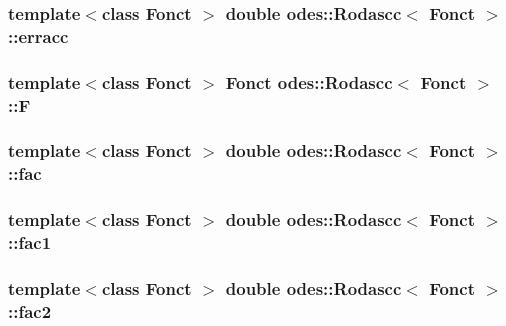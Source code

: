 \hypertarget{classodes_1_1Rodascc_a86ce68a4c2366fe38fce515466f5554e}{
\subsubsection[{erracc}]{\setlength{\rightskip}{0pt plus 5cm}template$<$class Fonct $>$ double {\bf odes\-::\-Rodascc}$<$ Fonct $>$\-::erracc\hspace{0.3cm}{\ttfamily [private]}}}\label{classodes_1_1Rodascc_a86ce68a4c2366fe38fce515466f5554e}
\hypertarget{classodes_1_1Rodascc_a472412c50cb400ce985364fbbc027e47}{
\subsubsection[{F}]{\setlength{\rightskip}{0pt plus 5cm}template$<$class Fonct $>$ Fonct {\bf odes\-::\-Rodascc}$<$ Fonct $>$\-::F\hspace{0.3cm}{\ttfamily [protected]}}}\label{classodes_1_1Rodascc_a472412c50cb400ce985364fbbc027e47}
\hypertarget{classodes_1_1Rodascc_aed92bfbf810660f7e938a74da9ce4f82}{
\subsubsection[{fac}]{\setlength{\rightskip}{0pt plus 5cm}template$<$class Fonct $>$ double {\bf odes\-::\-Rodascc}$<$ Fonct $>$\-::fac\hspace{0.3cm}{\ttfamily [private]}}}\label{classodes_1_1Rodascc_aed92bfbf810660f7e938a74da9ce4f82}
\hypertarget{classodes_1_1Rodascc_ab79d02557207039250e99fa7ccaf5183}{
\subsubsection[{fac1}]{\setlength{\rightskip}{0pt plus 5cm}template$<$class Fonct $>$ double {\bf odes\-::\-Rodascc}$<$ Fonct $>$\-::fac1\hspace{0.3cm}{\ttfamily [private]}}}\label{classodes_1_1Rodascc_ab79d02557207039250e99fa7ccaf5183}
\hypertarget{classodes_1_1Rodascc_af9c2fba60b567dc36adfc134fd777ed9}{
\subsubsection[{fac2}]{\setlength{\rightskip}{0pt plus 5cm}template$<$class Fonct $>$ double {\bf odes\-::\-Rodascc}$<$ Fonct $>$\-::fac2\hspace{0.3cm}{\ttfamily [private]}}}\label{classodes_1_1Rodascc_af9c2fba60b567dc36adfc134fd777ed9}
